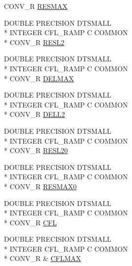 \begin{DoxyCompactItemize}
C\-O\-N\-V\-\_\-\-R \hyperlink{conv_8com_a5a9ca2e120b65c5a46caf09d3a3aff16}{R\-E\-S\-M\-A\-X}
\item 
D\-O\-U\-B\-L\-E P\-R\-E\-C\-I\-S\-I\-O\-N D\-T\-S\-M\-A\-L\-L \\*
I\-N\-T\-E\-G\-E\-R C\-F\-L\-\_\-\-R\-A\-M\-P C C\-O\-M\-M\-O\-N \\*
C\-O\-N\-V\-\_\-\-R \hyperlink{conv_8com_a4c87ffcd683e561c462fb951f8fd3dba}{R\-E\-S\-L2}
\item 
D\-O\-U\-B\-L\-E P\-R\-E\-C\-I\-S\-I\-O\-N D\-T\-S\-M\-A\-L\-L \\*
I\-N\-T\-E\-G\-E\-R C\-F\-L\-\_\-\-R\-A\-M\-P C C\-O\-M\-M\-O\-N \\*
C\-O\-N\-V\-\_\-\-R \hyperlink{conv_8com_a715eab8d5cd0cd49a247520cd432061c}{D\-E\-L\-M\-A\-X}
\item 
D\-O\-U\-B\-L\-E P\-R\-E\-C\-I\-S\-I\-O\-N D\-T\-S\-M\-A\-L\-L \\*
I\-N\-T\-E\-G\-E\-R C\-F\-L\-\_\-\-R\-A\-M\-P C C\-O\-M\-M\-O\-N \\*
C\-O\-N\-V\-\_\-\-R \hyperlink{conv_8com_a95e10880467f92be3f5430f2d2ac274b}{D\-E\-L\-L2}
\item 
D\-O\-U\-B\-L\-E P\-R\-E\-C\-I\-S\-I\-O\-N D\-T\-S\-M\-A\-L\-L \\*
I\-N\-T\-E\-G\-E\-R C\-F\-L\-\_\-\-R\-A\-M\-P C C\-O\-M\-M\-O\-N \\*
C\-O\-N\-V\-\_\-\-R \hyperlink{conv_8com_a7c9ea192bf2277352d3bf39c771cfdba}{R\-E\-S\-L20}
\item 
D\-O\-U\-B\-L\-E P\-R\-E\-C\-I\-S\-I\-O\-N D\-T\-S\-M\-A\-L\-L \\*
I\-N\-T\-E\-G\-E\-R C\-F\-L\-\_\-\-R\-A\-M\-P C C\-O\-M\-M\-O\-N \\*
C\-O\-N\-V\-\_\-\-R \hyperlink{conv_8com_a6783bad88b4fdda9cf12e1788ad0a190}{R\-E\-S\-M\-A\-X0}
\item 
D\-O\-U\-B\-L\-E P\-R\-E\-C\-I\-S\-I\-O\-N D\-T\-S\-M\-A\-L\-L \\*
I\-N\-T\-E\-G\-E\-R C\-F\-L\-\_\-\-R\-A\-M\-P C C\-O\-M\-M\-O\-N \\*
C\-O\-N\-V\-\_\-\-R \hyperlink{conv_8com_abba4cd7448a713602f433783798bc49f}{C\-F\-L}
\item 
D\-O\-U\-B\-L\-E P\-R\-E\-C\-I\-S\-I\-O\-N D\-T\-S\-M\-A\-L\-L \\*
I\-N\-T\-E\-G\-E\-R C\-F\-L\-\_\-\-R\-A\-M\-P C C\-O\-M\-M\-O\-N \\*
C\-O\-N\-V\-\_\-\-R \& \hyperlink{conv_8com_acefea3b10cf227cfbe18a5ae682cda07}{C\-F\-L\-M\-A\-X}
\item 

\end{DoxyCompactItemize}
